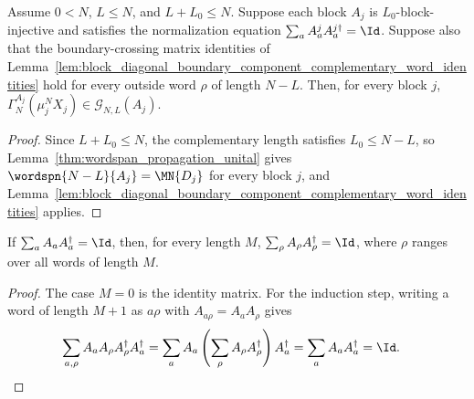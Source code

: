 \begin{lemma}
    \label{lem:block_diagonal_boundary_component_complementary_word_identities_injective}
    \leanok
    Assume $0<N$, $L\le N$, and $L+L_0\le N$. Suppose each block $A_j$
    is $L_0$-block-injective and satisfies the normalization equation
    $\sum_a A^j_aA^{j\dagger}_a=\Id$. Suppose also that the boundary-crossing
    matrix identities of
    Lemma~\ref{lem:block_diagonal_boundary_component_complementary_word_identities}
    hold for every outside word $\rho$ of length $N-L$. Then, for every block
    $j$,
    $\Gamma_N^{A_j}(\mu_j^NX_j) \in \mathcal G_{N,L}(A_j)$.
\end{lemma}

\begin{proof}
    \leanok
    Since $L+L_0\le N$, the complementary length satisfies $L_0\le N-L$, so
    Lemma~\ref{thm:wordspan_propagation_unital} gives
    $\wordspn{N-L}{A_j} = \MN{D_j}$ for every block $j$, and
    Lemma~\ref{lem:block_diagonal_boundary_component_complementary_word_identities}
    applies.
\end{proof}

\begin{lemma}
    \label{lem:sum_evalWord_mul_conjTranspose_evalWord}
    \leanok

    If $\sum_a A_aA_a^\dagger=\Id$, then, for every length $M$,
    $\sum_\rho A_\rho A_\rho^\dagger = \Id$,
    where $\rho$ ranges over all words of length $M$.
\end{lemma}

\begin{proof}
    \leanok

    The case $M=0$ is the identity matrix. For the induction step, writing a
    word of length $M+1$ as $a\rho$ with $A_{a\rho}=A_aA_\rho$ gives
    \begin{align}
        \sum_{a,\rho} A_aA_\rho A_\rho^\dagger A_a^\dagger
         & =
        \sum_a A_a
        \left(\sum_\rho A_\rho A_\rho^\dagger\right)
        A_a^\dagger =
        \sum_a A_aA_a^\dagger =
        \Id.
        \notag
    \end{align}
\end{proof}

